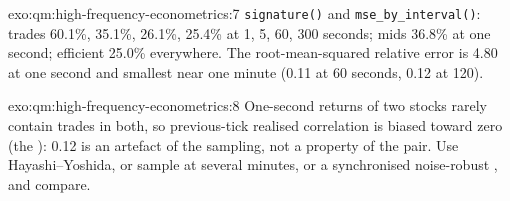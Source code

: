 \begin{solution}{exo:qm:high-frequency-econometrics:7}
\texttt{signature()} and \texttt{mse\_by\_interval()}: trades 60.1\%, 35.1\%, 26.1\%, 25.4\% at 1, 5, 60, 300 seconds; mids 36.8\% at one second; efficient 25.0\% everywhere. The
root-mean-squared relative error is 4.80 at one second and smallest near one minute (0.11 at 60 seconds, 0.12 at 120).
\end{solution}

\begin{solution}{exo:qm:high-frequency-econometrics:8}
One-second returns of two stocks rarely contain trades in both, so previous-tick realised correlation is biased toward zero (the ): 0.12 is an artefact of
the sampling, not a property of the pair. Use Hayashi--Yoshida, or sample at several minutes, or a synchronised noise-robust , and compare.
\end{solution}

